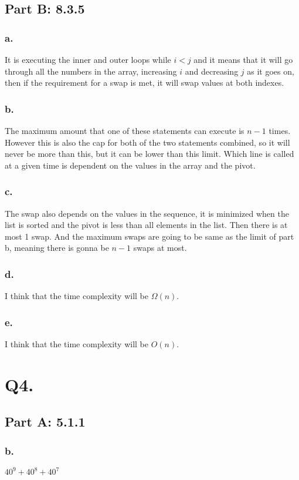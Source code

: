 \documentclass[titlepage]{article}\pagestyle{empty}
\begin{document}
\subsection*{Part B: 8.3.5}
\subsubsection*{a.} It is executing the inner and outer loops while $i < j$ and it means that it will go through all the numbers in the array, increasing $i$ and decreasing $j$ as it goes on, then if the requirement for a swap is met, it will swap values at both indexes.
\subsubsection*{b.} The maximum amount that one of these statements can execute is $n - 1$ times. However this is also the cap for both of the two statements combined, so it will never be more than this, but it can be lower than this limit. Which line is called at a given time is dependent on the values in the array and the pivot.
\subsubsection*{c.} The swap also depends on the values in the sequence, it is minimized when the list is sorted and the pivot is less than all elements in the list. Then there is at most 1 swap. And the maximum swaps are going to be same as the limit of part b, meaning there is gonna be $n - 1$ swaps at most.
\subsubsection*{d.} I think that the time complexity will be $\Omega(n)$.
\subsubsection*{e.} I think that the time complexity will be $O(n)$.

\pagebreak
\section*{Q4.}
\subsection*{Part A: 5.1.1}
\subsubsection*{b.} $40^9 + 40^8 + 40^7$
\end{document}
